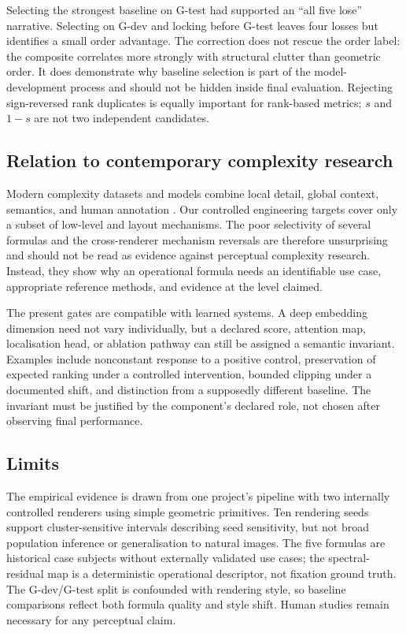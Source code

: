 Selecting the strongest baseline on G-test had supported an ``all five lose'' narrative. Selecting on G-dev and locking before G-test leaves four losses but identifies a small order advantage. The correction does not rescue the order label: the composite correlates more strongly with structural clutter than geometric order. It does demonstrate why baseline selection is part of the model-development process and should not be hidden inside final evaluation. Rejecting sign-reversed rank duplicates is equally important for rank-based metrics; $s$ and $1-s$ are not two independent candidates.

\subsection{Relation to contemporary complexity research}

Modern complexity datasets and models combine local detail, global context, semantics, and human annotation \citep{feng2023ic9600,kyledavidson2023complexity,guo2026dual}. Our controlled engineering targets cover only a subset of low-level and layout mechanisms. The poor selectivity of several formulas and the cross-renderer mechanism reversals are therefore unsurprising and should not be read as evidence against perceptual complexity research. Instead, they show why an operational formula needs an identifiable use case, appropriate reference methods, and evidence at the level claimed.

The present gates are compatible with learned systems. A deep embedding dimension need not vary individually, but a declared score, attention map, localisation head, or ablation pathway can still be assigned a semantic invariant. Examples include nonconstant response to a positive control, preservation of expected ranking under a controlled intervention, bounded clipping under a documented shift, and distinction from a supposedly different baseline. The invariant must be justified by the component's declared role, not chosen after observing final performance.

\subsection{Limits}

The empirical evidence is drawn from one project's pipeline with two internally controlled renderers using simple geometric primitives. Ten rendering seeds support cluster-sensitive intervals describing seed sensitivity, but not broad population inference or generalisation to natural images. The five formulas are historical case subjects without externally validated use cases; the spectral-residual map is a deterministic operational descriptor, not fixation ground truth. The G-dev/G-test split is confounded with rendering style, so baseline comparisons reflect both formula quality and style shift. Human studies remain necessary for any perceptual claim.

